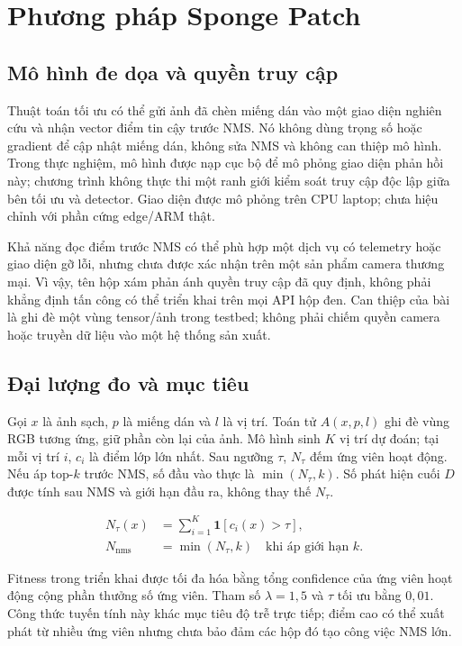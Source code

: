 \documentclass[a4paper,fleqn]{cas-dc}
\begin{document}
\section{Phương pháp Sponge Patch}

\subsection{Mô hình đe dọa và quyền truy cập}

Thuật toán tối ưu có thể gửi ảnh đã chèn miếng dán vào một giao diện nghiên cứu và nhận vector điểm tin cậy trước NMS. Nó không dùng trọng số hoặc gradient để cập nhật miếng dán, không sửa NMS và không can thiệp mô hình. Trong thực nghiệm, mô hình được nạp cục bộ để mô phỏng giao diện phản hồi này; chương trình không thực thi một ranh giới kiểm soát truy cập độc lập giữa bên tối ưu và detector. Giao diện được mô phỏng trên CPU laptop; chưa hiệu chỉnh với phần cứng edge/ARM thật.

Khả năng đọc điểm trước NMS có thể phù hợp một dịch vụ có telemetry hoặc giao diện gỡ lỗi, nhưng chưa được xác nhận trên một sản phẩm camera thương mại. Vì vậy, tên hộp xám phản ánh quyền truy cập đã quy định, không phải khẳng định tấn công có thể triển khai trên mọi API hộp đen. Can thiệp của bài là ghi đè một vùng tensor/ảnh trong testbed; không phải chiếm quyền camera hoặc truyền dữ liệu vào một hệ thống sản xuất.

\subsection{Đại lượng đo và mục tiêu}

Gọi $x$ là ảnh sạch, $p$ là miếng dán và $l$ là vị trí. Toán tử $A(x,p,l)$ ghi đè vùng RGB tương ứng, giữ phần còn lại của ảnh. Mô hình sinh $K$ vị trí dự đoán; tại mỗi vị trí $i$, $c_i$ là điểm lớp lớn nhất. Sau ngưỡng $\tau$, $N_\tau$ đếm ứng viên hoạt động. Nếu áp top-$k$ trước NMS, số đầu vào thực là $\min(N_\tau,k)$. Số phát hiện cuối $D$ được tính sau NMS và giới hạn đầu ra, không thay thế $N_\tau$.

\begin{equation}
\begin{aligned}
N_\tau(x)&=\sum_{i=1}^{K}\mathbf1[c_i(x)>\tau],\\
N_{\mathrm{nms}}&=\min(N_\tau,k)\quad\text{khi áp giới hạn }k.
\end{aligned}
\tag{1}
\end{equation}

Fitness trong triển khai được tối đa hóa bằng tổng confidence của ứng viên hoạt động cộng phần thưởng số ứng viên. Tham số $\lambda=1{,}5$ và $\tau$ tối ưu bằng $0{,}01$. Công thức tuyến tính này khác mục tiêu độ trễ trực tiếp; điểm cao có thể xuất phát từ nhiều ứng viên nhưng chưa bảo đảm các hộp đó tạo công việc NMS lớn.
\end{document}
